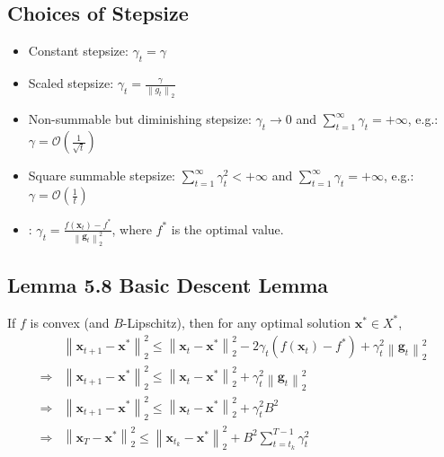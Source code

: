 \subsection*{Choices of Stepsize}
\begin{itemize}[leftmargin=*]
    \item Constant stepsize: $\gamma_{t}=\gamma$
    \item Scaled stepsize: $\gamma_{t}=\frac{\gamma}{\left\|g_{t}\right\|_{2}}$
    \item Non-summable but diminishing stepsize: $\gamma_{t} \rightarrow 0$ and $\sum_{t=1}^{\infty} \gamma_{t}=+\infty$, e.g.: $\gamma = \mathcal{O}\left(\frac{1}{\sqrt{t}}\right)$
    \item Square summable stepsize: $\sum_{t=1}^{\infty} \gamma_{t}^{2}<+\infty$ and $\sum_{t=1}^{\infty} \gamma_{t}=+\infty$, e.g.: $\gamma = \mathcal{O}\left(\frac{1}{t}\right)$
    \item {}: $\gamma_{t}=\frac{f\left(\mathbf{x}_{t}\right)-f^{*}}{\left\|\mathbf{g}_{t}\right\|_{2}^{2}}$, where $f^{*}$ is the optimal value.
\end{itemize}





\subsection*{Lemma 5.8 Basic Descent Lemma}
If $f$ is convex (and $B$-Lipschitz), then for any optimal solution $\mathbf{x}^{*} \in X^{*}$,
$$
\begin{aligned}
    &\left\|\mathbf{x}_{t+1}-\mathbf{x}^{*}\right\|_{2}^{2} \leq\left\|\mathbf{x}_{t}-\mathbf{x}^{*}\right\|_{2}^{2}-2 \gamma_{t}\left(f\left(\mathbf{x}_{t}\right)-f^{*}\right)+\gamma_{t}^{2}\left\|\mathbf{g}_{t}\right\|_{2}^{2} \\
    \Rightarrow &\left\|\mathbf{x}_{t+1}-\mathbf{x}^{*}\right\|_{2}^{2} \leq\left\|\mathbf{x}_{t}-\mathbf{x}^{*}\right\|_{2}^{2}+\gamma_{t}^{2}\left\|\mathbf{g}_{t}\right\|_{2}^{2} \\
    \Rightarrow &\left\|\mathbf{x}_{t+1}-\mathbf{x}^{*}\right\|_{2}^{2} \leq\left\|\mathbf{x}_{t}-\mathbf{x}^{*}\right\|_{2}^{2}+\gamma_{t}^{2}B^2 \\
    \Rightarrow &\left\|\mathbf{x}_{T}-\mathbf{x}^{*}\right\|_{2}^{2} \leq\left\|\mathbf{x}_{t_k}-\mathbf{x}^{*}\right\|_{2}^{2}+B^2 \sum_{t=t_k}^{T-1}\gamma_t^2
\end{aligned}
$$




